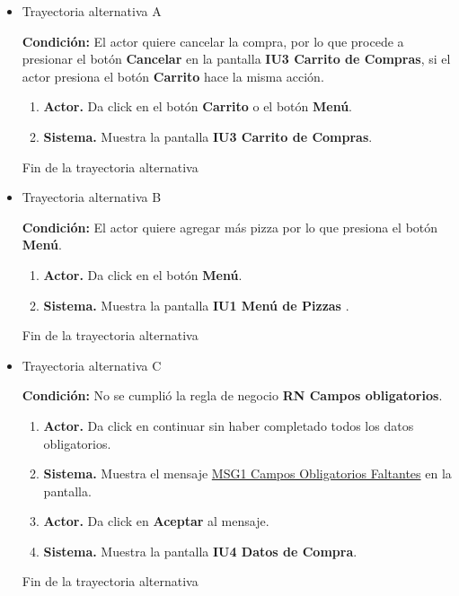 \begin{itemize}
	
	\item \hypertarget{CU3:TAA}{Trayectoria alternativa A}
	
	\noindent \textbf{Condición:} El actor quiere cancelar la compra, por lo que procede a presionar el botón \textbf{Cancelar} en la pantalla \textbf{IU3 Carrito de Compras}, si el actor presiona el botón \textbf{Carrito} hace la misma acción.
	
	\begin{enumerate}
		\item \textbf{Actor.} Da click en el botón \textbf{Carrito} o el botón \textbf{Menú}.
		\item \textbf{Sistema.} Muestra la pantalla \textbf{IU3 Carrito de Compras}.
	\end{enumerate}
	
	Fin de la trayectoria alternativa
	
	\item \hypertarget{CU3:TAB}{Trayectoria alternativa B}
	
	\noindent \textbf{Condición:} El actor quiere agregar más pizza por lo que presiona el botón \textbf{Menú}.
	
	\begin{enumerate}
		\item \textbf{Actor.} Da click en el botón \textbf{Menú}.
		\item \textbf{Sistema.} Muestra la pantalla \textbf{IU1 Menú de Pizzas }.
	\end{enumerate}
	
	Fin de la trayectoria alternativa
	
	\item \hypertarget{CU3:TAC}{Trayectoria alternativa C}
	
	\noindent \textbf{Condición:} No se cumplió la regla de negocio \textbf{RN Campos obligatorios}.
	
	\begin{enumerate}
		\item \textbf{Actor.} Da click en continuar sin haber completado todos los datos obligatorios.
		\item \textbf{Sistema.} Muestra el mensaje \hyperlink{MSG1:CamposObligatorios}{MSG1 Campos Obligatorios Faltantes} en la pantalla.
		\item \textbf{Actor.} Da click en \textbf{Aceptar} al mensaje.
		\item \textbf{Sistema.} Muestra la pantalla \textbf{IU4 Datos de Compra}.
	\end{enumerate}
	
	Fin de la trayectoria alternativa
	
\end{itemize}

